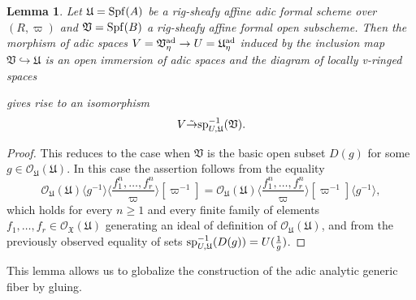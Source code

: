 \documentclass[12pt,twoside,a4paper]{article}
\newtheorem{lemma}[thm]{Lemma}
\theoremstyle{definition}
\theoremstyle{remark}
\newcommand\ad{{\rm ad}}
\newcommand\spc{{\rm sp}}
\newcommand\Spf{{\rm Spf}}
\begin{document}
\begin{lemma}\label{Generic fibers and open immersions}Let $\mathfrak{U}=\Spf(A)$ be a rig-sheafy affine adic formal scheme over $(R, \varpi)$ and $\mathfrak{V}=\Spf(B)$ a rig-sheafy affine formal open subscheme. Then the morphism of adic spaces $V=\mathfrak{V}_{\eta}^{\ad}\to U=\mathfrak{U}_{\eta}^{\ad}$ induced by the inclusion map $\mathfrak{V}\hookrightarrow \mathfrak{U}$ is an open immersion of adic spaces and the diagram of locally v-ringed spaces \begin{center}\end{center}gives rise to an isomorphism \begin{equation*}V\tilde{\rightarrow}\spc_{U,\mathfrak{U}}^{-1}(\mathfrak{V}).\end{equation*}\end{lemma}
\begin{proof}This reduces to the case when $\mathfrak{V}$ is the basic open subset $D(g)$ for some $g\in \mathcal{O}_{\mathfrak{U}}(\mathfrak{U})$. In this case the assertion follows from the equality \begin{equation*}\mathcal{O}_{\mathfrak{U}}(\mathfrak{U})\langle g^{-1}\rangle\langle\frac{f_1^{n},\dots, f_r^{n}}{\varpi}\rangle[\varpi^{-1}]=\mathcal{O}_{\mathfrak{U}}(\mathfrak{U})\langle\frac{f_1^{n},\dots, f_r^{n}}{\varpi}\rangle[\varpi^{-1}]\langle g^{-1}\rangle,\end{equation*}which holds for every $n\geq 1$ and every finite family of elements $f_1,\dots, f_r\in \mathcal{O}_{\mathfrak{X}}(\mathfrak{U})$ generating an ideal of definition of $\mathcal{O}_{\mathfrak{U}}(\mathfrak{U})$, and from the previously observed equality of sets $\spc_{U,\mathfrak{U}}^{-1}(D(g))=U(\frac{1}{g})$.\end{proof}This lemma allows us to globalize the construction of the adic analytic generic fiber by gluing.
\end{document}

